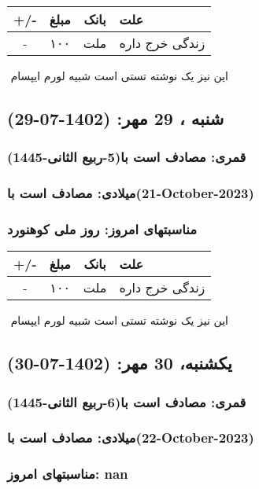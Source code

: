 \documentclass{article}
\newcommand{\rnote}[1]{\marginpar{\textcolor{color}{\StrSubstitute{\##1}{ }{\_}}}}
\newcommand{\myRow}[4]{
    #1 & #2 & #3 & #4 \\ \hline
}
\begin{document}
\begin{tabular}{ | c | c | c | p{5cm} |}
    \hline
    \myRow{ +/- }{مبلغ}{بانک}{علت}
    \myRow{-}{۱۰۰}{ملت}{زندگی خرج داره}
\end{tabular}
\newline
\newline

‌
\rnote{تست}
این نیز یک نوشته تستی است شبیه لورم ایپسام




\newpage
{}
\textcolor{color}{
\section{ شنبه ، 29 مهر: (1402-07-29) }
\subsubsection*{قمری: مصادف است با(5-ربیع الثانی-1445)} 
\subsubsection*{میلادی: مصادف است با(21-October-2023)}
\subsubsection*{مناسبتهای امروز: روز ملی کوهنورد}
}


\begin{tabular}{ | c | c | c | p{5cm} |}
    \hline
    \myRow{ +/- }{مبلغ}{بانک}{علت}
    \myRow{-}{۱۰۰}{ملت}{زندگی خرج داره}
\end{tabular}
\newline
\newline

‌
\rnote{تست}
این نیز یک نوشته تستی است شبیه لورم ایپسام




\newpage
{}
\textcolor{color}{
\section{ یکشنبه، 30 مهر: (1402-07-30) }
\subsubsection*{قمری: مصادف است با(6-ربیع الثانی-1445)} 
\subsubsection*{میلادی: مصادف است با(22-October-2023)}
\subsubsection*{مناسبتهای امروز: nan}
}
\end{document}
